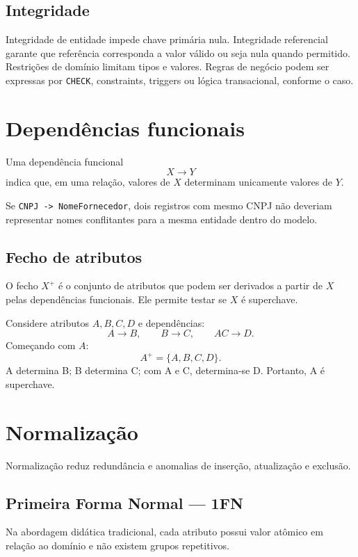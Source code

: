 \subsection{Integridade}

Integridade de entidade impede chave primária nula. Integridade referencial garante que referência corresponda a valor válido ou seja nula quando permitido. Restrições de domínio limitam tipos e valores. Regras de negócio podem ser expressas por \texttt{CHECK}, constraints, triggers ou lógica transacional, conforme o caso.

\section{Dependências funcionais}

Uma dependência funcional
\[
X\rightarrow Y
\]
indica que, em uma relação, valores de $X$ determinam unicamente valores de $Y$.

Se \texttt{CNPJ -> NomeFornecedor}, dois registros com mesmo CNPJ não deveriam representar nomes conflitantes para a mesma entidade dentro do modelo.

\subsection{Fecho de atributos}

O fecho $X^+$ é o conjunto de atributos que podem ser derivados a partir de $X$ pelas dependências funcionais. Ele permite testar se $X$ é superchave.

\begin{exemplo}[fecho]
Considere atributos $A,B,C,D$ e dependências:
\[
A\to B,\qquad B\to C,\qquad AC\to D.
\]
Começando com $A$:
\[
A^+=\{A,B,C,D\}.
\]
A determina B; B determina C; com A e C, determina-se D. Portanto, A é superchave.
\end{exemplo}

\section{Normalização}

Normalização reduz redundância e anomalias de inserção, atualização e exclusão.

\subsection{Primeira Forma Normal — 1FN}

Na abordagem didática tradicional, cada atributo possui valor atômico em relação ao domínio e não existem grupos repetitivos.

